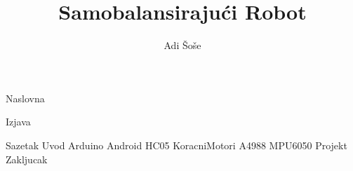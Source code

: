 \documentclass[12pt,a4paper]{article}
\title{Samobalansirajući Robot}
\author{Adi Šoše}
\begin{document}
\selectfont


{Naslovna}

{Izjava}
\pagebreak

\setcounter{page}{1}
\renewcommand*\contentsname{Sadržaj}
\tableofcontents

\pagebreak
{}



\linespread{1.3}

{Sazetak}
{Uvod}
{Arduino}
{Android}
{HC05}
{KoracniMotori}
{A4988}
{MPU6050}
{Projekt}
{Zakljucak}
\end{document}

